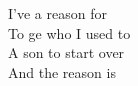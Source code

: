 I've  a reason for  \\
To ge who I used to  \\
A son to start over  \\
\songwordfb{ } And the reason is  \\
